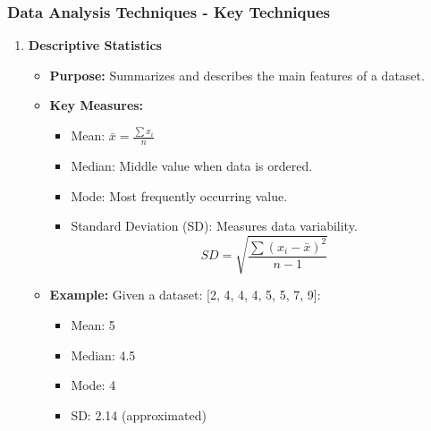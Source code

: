 \documentclass[aspectratio=169]{beamer}
\begin{document}
\begin{frame}[fragile]
    \frametitle{Data Analysis Techniques - Key Techniques}
    \begin{enumerate}
        \item \textbf{Descriptive Statistics}
        \begin{itemize}
            \item \textbf{Purpose:} Summarizes and describes the main features of a dataset.
            \item \textbf{Key Measures:}
            \begin{itemize}
                \item Mean: \( \bar{x} = \frac{\sum{x_i}}{n} \)
                \item Median: Middle value when data is ordered.
                \item Mode: Most frequently occurring value.
                \item Standard Deviation (SD): Measures data variability.
                \begin{equation}
                    SD = \sqrt{\frac{\sum{(x_i - \bar{x})^2}}{n-1}}
                \end{equation}
            \end{itemize}
            \item \textbf{Example:} Given a dataset: [2, 4, 4, 4, 5, 5, 7, 9]:
            \begin{itemize}
                \item Mean: 5
                \item Median: 4.5
                \item Mode: 4
                \item SD: 2.14 (approximated)
            \end{itemize}
        \end{itemize}
    \end{enumerate}
\end{frame}
\end{document}
